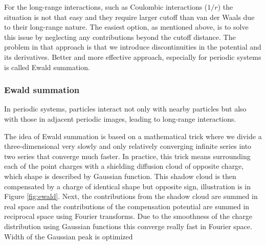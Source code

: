 For the long-range interactions, such as Coulombic interactions ($1/r$) the situation is not that easy and they require larger cutoff than van der Waals due to their long-range nature. The easiest option, as mentioned above, is to solve this issue by neglecting any contributions beyond the cutoff distance. The problem in that approach is that we introduce discontinuities in the potential and its derivatives. Better and more effective approach, especially for periodic systems is called Ewald summation.


\subsubsection{Ewald summation}
In periodic systems, particles interact not only with nearby particles but also with those in adjacent periodic images, leading to long-range interactions. 

The idea of Ewald summation is based on a mathematical trick where we divide a three-dimensional very slowly and only relatively converging infinite series into two series that converge much faster. In practice, this trick means surrounding each of the point charges with a shielding diffusion cloud of opposite charge, which shape is described by Gaussian function. This shadow cloud is then compensated by a charge of identical shape but opposite sign, illustration is in Figure \ref{fig:ewald}. Next, the contributions from the shadow cloud are summed in real space and the contributions of the compensation potential are summed in reciprocal space using Fourier transforms. Due to the smoothness of the charge distribution using Gaussian functions this converge really fast in Fourier space. Width of the Gaussian peak is optimized   


